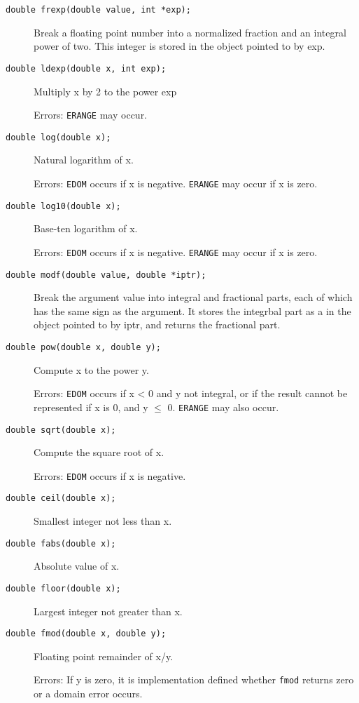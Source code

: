 \begin{description}
   \item[\texttt{double frexp(double value, int *exp);}] Break a floating point number into a normalized fraction
    and an integral power of two. This integer is stored in
    the object pointed to by exp.

   \item[\texttt{double ldexp(double x, int exp);}] Multiply x by 2 to the power exp

    Errors: \texttt{ERANGE} may occur.

   \item[\texttt{double log(double x);}] Natural logarithm of x.

    Errors: \texttt{EDOM} occurs if x is negative.
    \texttt{ERANGE} may occur if x is zero.

   \item[\texttt{double log10(double x);}] Base-ten logarithm of x.

    Errors: \texttt{EDOM} occurs if x is negative.
    \texttt{ERANGE} may occur if x is zero.

   \item[\texttt{double modf(double value, double *iptr);}] Break the argument value into integral and fractional
    parts, each of which has the same sign as the argument.
    It stores the integrbal part as a \double{} in the object
    pointed to by iptr, and returns the fractional part.

   \item[\texttt{double pow(double x, double y);}] Compute x to the power y.

    Errors: \texttt{EDOM} occurs if x < 0 and
    y not integral, or if the result cannot be represented if
    x is 0, and y $\leq$ 0.
    \texttt{ERANGE} may also occur.

   \item[\texttt{double sqrt(double x);}] Compute the square root of x.

    Errors: \texttt{EDOM} occurs if x is negative.

   \item[\texttt{double ceil(double x);}] Smallest integer not less than x.

   \item[\texttt{double fabs(double x);}] Absolute value of x.

   \item[\texttt{double floor(double x);}] Largest integer not greater than x.

   \item[\texttt{double fmod(double x, double y);}] Floating point remainder of x/y.

    Errors: If y is zero, it is implementation defined
    whether \texttt{fmod} returns zero or a domain error occurs.
  \end{description}

